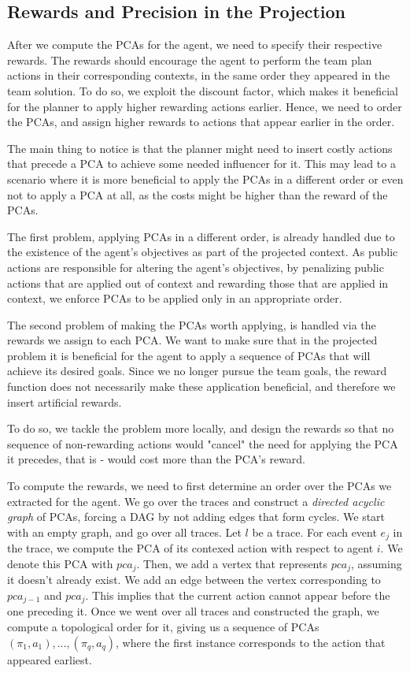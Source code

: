 \documentclass[letterpaper]{article} %
\begin{document}
\subsection{Rewards and Precision in the Projection}

After we compute the PCAs for the agent, we need to specify their respective rewards. The rewards should encourage the agent to perform the team plan actions in their corresponding contexts, in the same order they appeared in the team solution. 
To do so, we exploit the discount factor, which makes it beneficial for the planner to apply higher rewarding actions earlier. Hence, we need to order the PCAs, and assign higher rewards to actions that appear earlier in the order.

The main thing to notice is that the planner might need to insert costly actions that precede a PCA to achieve some needed influencer for it. This may lead to a scenario where it is more beneficial to apply the PCAs in a different order or even not to apply a PCA at all, as the costs might be higher than the reward of the PCAs.

The first problem, applying PCAs in a different order, is already handled due to the existence of the agent's objectives as part of the projected context. As public actions are responsible for altering the agent's objectives, by penalizing public actions that are applied out of context and rewarding those that are applied in context, we enforce PCAs to be applied only in an appropriate order.

The second problem of making the PCAs worth applying, is handled via the rewards we assign to each PCA. We want to make sure that in the projected problem it is beneficial for the agent to apply a sequence of PCAs that will achieve its desired goals. Since we no longer pursue the team goals, the reward function does not necessarily make these application beneficial, and therefore we insert artificial rewards.

To do so, we tackle the problem more locally, and design the rewards so that no sequence of non-rewarding actions would "cancel" the need for applying the PCA it precedes, that is - would cost more than the PCA's reward.

To compute the rewards, we need to first determine an order over the PCAs we extracted for the agent.
We go over the traces and construct a \emph{directed acyclic graph} of PCAs, forcing a DAG by not adding edges that form cycles.
We start with an empty graph, and go over all traces. Let $l$ be a trace. For each event $e_j$ in the trace, we compute the PCA of its contexed action with respect to agent $i$. We denote this PCA with $pca_j$.
Then, we add a vertex that represents $pca_j$, assuming it doesn't already exist. We add an edge between the vertex corresponding to $pca_{j-1}$ and $pca_j$.
This implies that the current action cannot appear before the one preceding it.
Once we went over all traces and constructed the graph, we compute a topological order
for it, giving us a sequence of PCAs $(\pi_1, a_1),..., (\pi_q, a_q)$, where the first instance corresponds to the action that appeared earliest.
\end{document}
